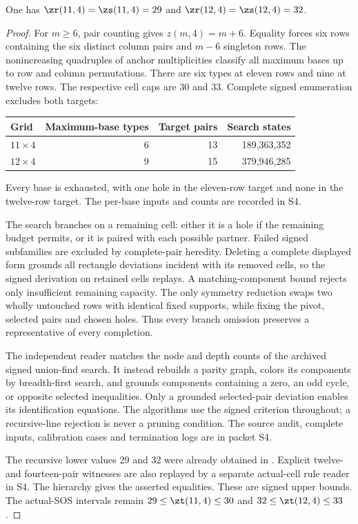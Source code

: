 \begin{proposition}\label{prop:four-signed}
One has $\zr(11,4)=\zs(11,4)=29$ and $\zr(12,4)=\zs(12,4)=32$.
\end{proposition}
\begin{proof}
For $m\ge6$, pair counting gives $z(m,4)=m+6$. Equality forces six
rows containing the six distinct column pairs and $m-6$ singleton rows.
The nonincreasing quadruples of anchor multiplicities classify all maximum
bases up to row and column permutations. There are six types at eleven
rows and nine at twelve rows. The respective cell caps are 30 and 33.
Complete signed enumeration excludes both targets:
\begin{center}
\begin{tabular}{lrrr}
\toprule
Grid&Maximum-base types&Target pairs&Search states\\
\midrule
$11\times4$&6&13&189,363,352\\
$12\times4$&9&15&379,946,285\\
\bottomrule
\end{tabular}
\end{center}
Every base is exhausted, with one hole in the eleven-row target and none
in the twelve-row target. The per-base inputs and counts are recorded in S4.

The search branches on a remaining
cell: either it is a hole if the remaining budget permits, or it is paired
with each possible partner. Failed signed subfamilies are excluded by complete-pair heredity.
Deleting a complete displayed form grounds all rectangle deviations incident
with its removed cells, so the signed derivation on retained cells replays.
A matching-component bound rejects only insufficient remaining capacity.
The only symmetry reduction swaps two wholly untouched rows with identical
fixed supports, while fixing the pivot, selected pairs and chosen holes.
Thus every branch omission preserves a representative of every completion.

The independent reader matches the node and depth counts of the archived
signed union-find search. It instead
rebuilds a parity graph, colors its components by breadth-first search,
and grounds components containing a zero, an odd cycle, or opposite selected
inequalities. Only a grounded selected-pair deviation enables its
identification equations. The algorithms use the signed criterion throughout;
a recursive-line rejection is never a pruning condition. The source audit,
complete inputs, calibration cases and termination logs are in packet S4.

The recursive lower values 29 and 32 were already obtained in \cite{CC}.
Explicit twelve- and fourteen-pair witnesses are also replayed by a separate
actual-cell rule reader in S4. The hierarchy gives the asserted equalities.
These are signed upper bounds. The actual-SOS intervals remain
$29\le\zt(11,4)\le30$ and $32\le\zt(12,4)\le33$.
\end{proof}

